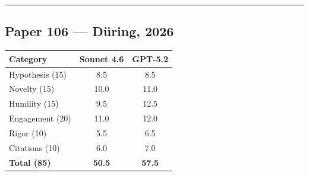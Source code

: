 \documentclass[11pt]{article}
\begin{document}
\bigskip
\hrule
\bigskip

\subsection*{Paper 106 --- Düring, 2026}

\medskip

\begin{tabular}{lcc}
\toprule
\textbf{Category} & \textbf{Sonnet 4.6} & \textbf{GPT-5.2} \\
\midrule
Hypothesis (15) & 8.5 & 8.5 \\
Novelty (15) & 10.0 & 11.0 \\
Humility (15) & 9.5 & 12.5 \\
Engagement (20) & 11.0 & 12.0 \\
Rigor (10) & 5.5 & 6.5 \\
Citations (10) & 6.0 & 7.0 \\
\midrule
\textbf{Total (85)} & \textbf{50.5} & \textbf{57.5} \\
\bottomrule
\end{tabular}

\bigskip
\end{document}
